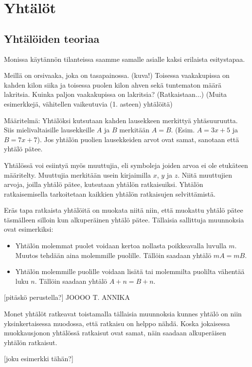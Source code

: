 %
\part{Yhtälöt}
\chapter{Yhtälöiden teoriaa}
Monissa käytännön tilanteissa saamme samalle asialle kaksi erilaista esitystapaa.

\begin{esimerkki}
Meillä on orsivaaka, joka on tasapainossa. (kuva!) Toisessa vaakakupissa on kahden kilon siika ja toisessa puolen kilon ahven sekä tuntematon määrä lakritsia. Kuinka paljon vaakakupissa on lakritsia? (Ratkaistaan...) (Muita esimerkkejä, vähitellen vaikeutuvia (1. asteen) yhtälöitä)
\end{esimerkki}

Määritelmä: Yhtälöksi kutsutaan kahden lausekkeen merkittyä yhtäsuuruutta. Siis mielivaltaisille lausekkeille $A$ ja $B$ merkitään $A=B$. (Esim. $A=3x+5$ ja $B=7x+7$). Jos yhtälön puolien lausekkeiden arvot ovat samat, sanotaan että yhtälö pätee. 

Yhtälössä voi esiintyä myös muuttujia, eli symboleja joiden arvoa ei ole etukäteen määritelty. Muuttujia merkitään usein kirjaimilla $x$, $y$ ja $z$. Niitä muuttujien arvoja, joilla yhtälö pätee, kutsutaan yhtälön ratkaisuiksi. Yhtälön ratkaisemisella tarkoitetaan kaikkien yhtälön ratkaisujen selvittämistä.

Eräs tapa ratkaista yhtälöitä on muokata niitä niin, että muokattu yhtälö pätee täsmälleen silloin kun alkuperäinen yhtälö pätee. Tällaisia sallittuja muunnoksia ovat esimerkiksi:
\begin{itemize}
\item Yhtälön molemmat puolet voidaan kertoa nollasta poikkeavalla luvulla $m$. Muutos tehdään aina molemmille puolille. Tällöin saadaan yhtälö $mA = mB$.
\item Yhtälön molemmille puolille voidaan lisätä tai molemmilta puolilta vähentää luku $n$.
Tällöin saadaan yhtälö $A+n = B+n$.
\end{itemize}
[pitäskö perustella?] JOOOO T. ANNIKA

Monet yhtälöt ratkeavat toistamalla tällaisia muunnoksia kunnes yhtälö on niin yksinkertaisessa muodossa, että ratkaisu on helppo nähdä. Koska jokaisessa muokkausjonon yhtälössä ratkaisut ovat samat, näin saadaan alkuperäisen yhtälön ratkaisut.

[joku esimerkki tähän?]

